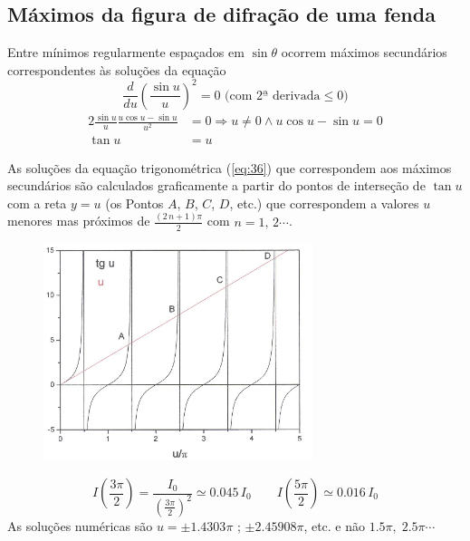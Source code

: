 \documentclass[a4paper,12pt]{article}
\begin{document}
\subsection{Máximos da figura de difração de uma fenda} \label{sec:maxfenda}
Entre mínimos regularmente espaçados em $\sin \theta $ ocorrem máximos secundários correspondentes às soluções da equação 
\begin{equation}
	\label{eq:35} \frac{d}{d u} \left( \frac{\sin u}{u} \right)^2 = 0 \text{ (com 2ª derivada} \le 0) 
\end{equation}
\begin{align}
	\label{eq:36} 2 \frac{\sin u}{u} \frac{u \cos u- \sin u}{u^2} &= 0 \Rightarrow u \ne 0 \land u \cos u- \sin u =0\nonumber \\
	\tan u &= u 
\end{align}



As soluções da equação trigonométrica (\ref{eq:36}) que correspondem aos máximos secundários são calculados graficamente a partir do pontos de interseção de $\tan u$ com a reta $y=u$ (os Pontos $A$, $B$, $C$, $D$, etc.) que correspondem a valores $u$ menores mas próximos de $\frac{(2\,n +1)\pi}{2}$ com $n=1,\,2 \cdots$. 
\begin{figure}
	[htb] \label{fig:5} \centering 
	\includegraphics[width=0.7\textwidth]{figura5.png} \caption{ } 
\end{figure}
\begin{equation*}
	I(\frac{3\pi}{2}) =\frac{I_0}{(\frac{3\pi}{2})^2} \simeq 0.045 \, I_0 \qquad I(\frac{5\pi}{2}) \simeq 0.016 \, I_0 
\end{equation*}
As soluções numéricas são $u=\pm 1.4303\pi$ ; $\pm 2.45908\pi$, etc. e não $1.5\pi, \; 2.5\pi \cdots$ 
\end{document}
